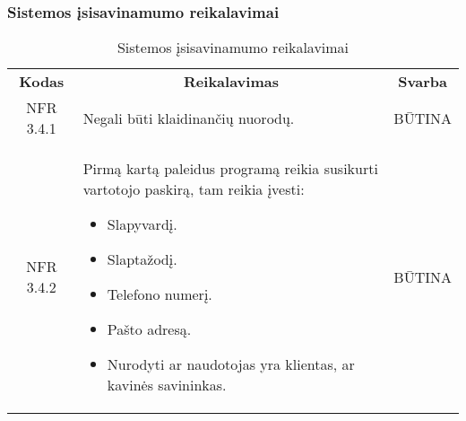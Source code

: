 \documentclass{VUMIFPSkursinis}
\begin{document}
\subsubsection{Sistemos įsisavinamumo reikalavimai}
\begin{center}
	\begin{table}[H]
	\begin{tabular}{|p{2cm}|p{}|p{}|}
	\hline
	    \rowcolor{lightgray}
		\multicolumn{3}{|c|}{Sistemos įsisavinamumo reikalavimai}\\
		
	\hline
		\multicolumn{1}{|c|}{{\bfseries Kodas}}&
		\multicolumn{1}{|c|}{{\bfseries Reikalavimas}}&
		\multicolumn{1}{|c|}{{\bfseries Svarba}}\\
	\hline 	
		\multicolumn{1}{|c|}{NFR 3.4.1}&
		{Negali būti klaidinančių nuorodų.}&
		\multicolumn{1}{|c|}{BŪTINA}\\	
	
	\hline 	
		\multicolumn{1}{|c|}{NFR 3.4.2}&
		{Pirmą kartą paleidus programą reikia susikurti vartotojo paskirą, tam reikia įvesti:
			\begin{itemize}
				\item Slapyvardį.
				\item Slaptažodį.
				\item Telefono numerį.
				\item Pašto adresą.
				\item Nurodyti ar naudotojas yra klientas, ar kavinės savininkas.
			\end{itemize}}&
		\multicolumn{1}{|c|}{BŪTINA}\\	
	
	\hline 	
	
	\end{tabular}
	\caption{Sistemos įsisavinamumo reikalavimai}
	\label{table:Sistemosįsisavinamumoreikalavimai}
	\end{table}

\end{center}
\end{document}
